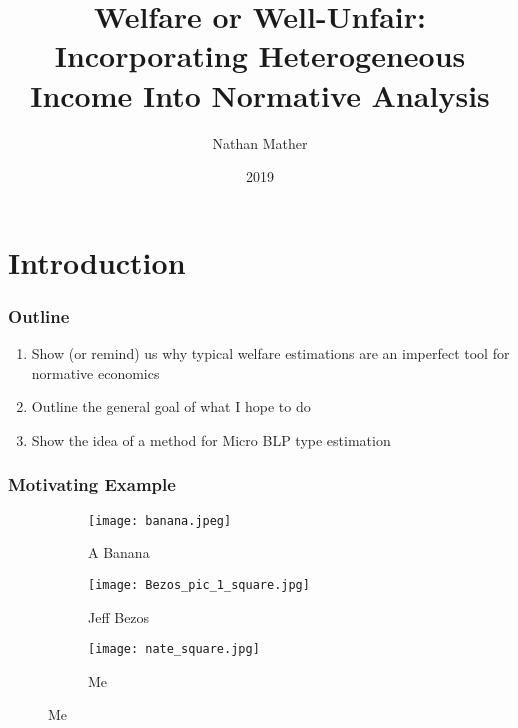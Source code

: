 \documentclass{beamer}
\title{Welfare or Well-Unfair: Incorporating Heterogeneous Income Into Normative Analysis}
\author{Nathan Mather}
\institute{University of Michigan}
\date{2019}
\begin{document}
	
	\frame{\titlepage}
	
\section{Introduction}

\begin{frame}
	\frametitle{Outline}
	\begin{enumerate}
		\setlength{\itemsep}{8mm}
		 \large
		 \item Show (or remind) us why typical welfare estimations are an imperfect tool for normative economics 
		\item Outline the general goal of what I hope to do 
		\item Show the idea of a method for Micro BLP type estimation
	\end{enumerate}
\end{frame}



\begin{frame}
\frametitle{Motivating Example}

\begin{figure}
	\centering
\begin{subfigure}[b]{.3\linewidth}
	\texttt{[image: banana.jpeg]}
	\caption{A Banana}\label{fig:banana}
\end{subfigure}


\begin{subfigure}[b]{.3\linewidth}
	\texttt{[image: Bezos\_pic\_1\_square.jpg]}
	\caption{Jeff Bezos}\label{fig:Bezos}
\end{subfigure}
\begin{subfigure}[b]{.3\linewidth}
	\texttt{[image: nate\_square.jpg]}
	\caption{Me}\label{fig:Nate}
\end{subfigure}
\end{figure}

\end{frame}
\end{document}
